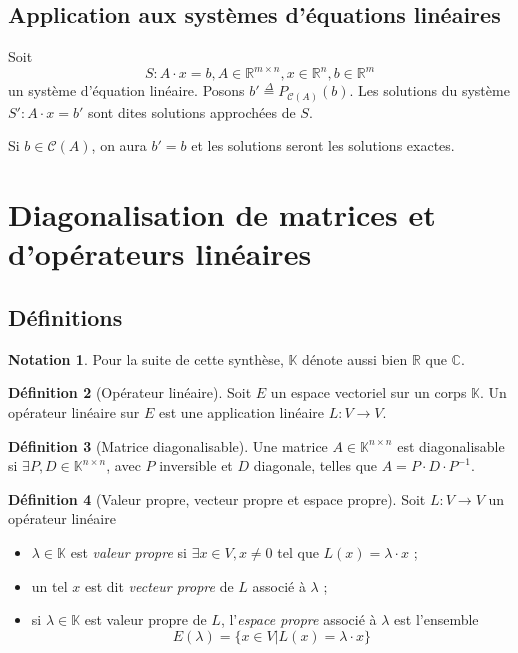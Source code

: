 \documentclass[11pt,a4paper]{article}
\theoremstyle{definition}
\newtheorem{mydef}{Définition}%
\newtheorem{mynota}[mydef]{Notation}
\newcommand{\eqdef}{\stackrel{\Delta}{=}}
\newcommand{\R}{\mathbb{R}}
\newcommand{\Rn}{\R^n}
\newcommand{\C}{\mathbb{C}}
\newcommand{\K}{\mathbb{K}}
\newcommand{\Knn}{\K^{n \times n}}
\begin{document}
\subsection{Application aux systèmes d'équations linéaires}
Soit
\[ S : A \cdot x = b, A \in \R^{m \times n}, x \in \Rn, b \in \R^m \]
un système d'équation linéaire.
Posons $b' \eqdef P_{\mathcal{C}(A)}(b)$.
Les solutions du système $S' : A \cdot x = b'$ sont dites solutions approchées de $S$.

Si $b \in \mathcal{C}(A)$, on aura $b' = b$ et les solutions seront les solutions exactes.


\section{Diagonalisation de matrices et d'opérateurs linéaires}

\subsection{Définitions}

\begin{mynota}
	Pour la suite de cette synthèse, $\K$ dénote aussi bien $\R$ que $\C$.
\end{mynota}

\begin{mydef}[Opérateur linéaire]
	Soit $E$ un espace vectoriel sur un corps $\K$.
	Un opérateur linéaire sur $E$ est une application linéaire $L: V \to V$.
\end{mydef}

\begin{mydef}[Matrice diagonalisable]
	Une matrice $A \in \Knn$ est diagonalisable si $\exists P, D \in \Knn$, avec $P$ inversible et $D$ diagonale, telles que $A = P \cdot D \cdot P^{-1}$.
\end{mydef}

\begin{mydef}[Valeur propre, vecteur propre et espace propre] Soit $L : V \rightarrow V$ un opérateur linéaire
	\begin{itemize}
		\item $\lambda \in \K$ est \emph{valeur propre} si $\exists x \in V, x \neq 0$ tel que $L(x) = \lambda \cdot x$ ;
		\item un tel $x$ est dit \emph{vecteur propre} de $L$ associé à $\lambda$ ;
		\item si $\lambda \in \K$ est valeur propre de $L$, l'\emph{espace propre} associé à $\lambda$ est l'ensemble
			\[ E(\lambda) = \{ x \in V | L(x) = \lambda \cdot x \} \]
	\end{itemize}
\end{mydef}
\end{document}

